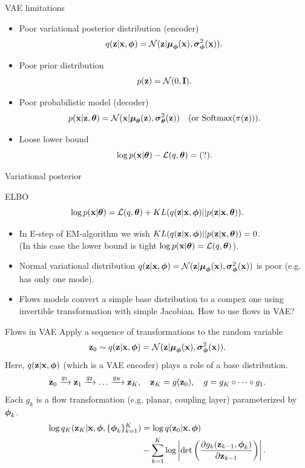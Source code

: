 \begin{frame}{VAE limitations}
\begin{itemize}
	\item Poor variational posterior distribution (encoder)
	\[
	q(\mathbf{z} | \mathbf{x}, \boldsymbol{\phi}) = \mathcal{N}(\mathbf{z}| \boldsymbol{\mu}_{\boldsymbol{\phi}}(\mathbf{x}), \boldsymbol{\sigma}^2_{\boldsymbol{\phi}}(\mathbf{x})).
	\]
	\item Poor prior distribution
	\[
	p(\mathbf{z}) = \mathcal{N}(0, \mathbf{I}).
	\]
	\item Poor probabilistic model (decoder)
	\[
	p(\mathbf{x} | \mathbf{z}, \boldsymbol{\theta}) = \mathcal{N}(\mathbf{x}| \boldsymbol{\mu}_{\boldsymbol{\theta}}(\mathbf{z}), \boldsymbol{\sigma}^2_{\boldsymbol{\theta}}(\mathbf{z})) \quad (\text{or } \text{Softmax}(\pi(\mathbf{z}))).
	\]
	\item Loose lower bound
	\[
	\log p(\mathbf{x} | \boldsymbol{\theta}) - \mathcal{L}(q, \boldsymbol{\theta}) = (?).
	\]
\end{itemize}
\end{frame}
\begin{frame}{Variational posterior}
\begin{block}{ELBO}
	\[
	\log p(\mathbf{x} | \boldsymbol{\theta}) = \mathcal{L}(q, \boldsymbol{\theta}) + KL(q(\mathbf{z} | \mathbf{x}, \boldsymbol{\phi}) || p(\mathbf{z} | \mathbf{x}, \boldsymbol{\theta})).
	\]
\end{block}
\begin{itemize}
	\item In E-step of EM-algorithm we wish $KL(q(\mathbf{z} | \mathbf{x}, \boldsymbol{\phi}) || p(\mathbf{z} | \mathbf{x}, \boldsymbol{\theta})) = 0$. \\
	(In this case the lower bound is tight $\log p(\mathbf{x} | \boldsymbol{\theta}) = \mathcal{L}(q, \boldsymbol{\theta})$). \\
	\item Normal variational distribution $q(\mathbf{z} | \mathbf{x}, \boldsymbol{\phi}) = \mathcal{N}(\mathbf{z}| \boldsymbol{\mu}_{\boldsymbol{\phi}}(\mathbf{x}), \boldsymbol{\sigma}^2_{\boldsymbol{\phi}}(\mathbf{x}))$ is poor (e.g. has only one mode). \\
	\item Flows models convert a simple base distribution to a compex one using invertible transformation with simple Jacobian. How to use flows in VAE?
\end{itemize}
\end{frame}
\begin{frame}{Flows in VAE}
Apply a sequence of transformations to the random variable
\[
\mathbf{z}_0 \sim q(\mathbf{z} | \mathbf{x}, \boldsymbol{\phi}) = \mathcal{N}(\mathbf{z}| \boldsymbol{\mu}_{\boldsymbol{\phi}}(\mathbf{x}), \boldsymbol{\sigma}^2_{\boldsymbol{\phi}}(\mathbf{x})).
\]
Here, $q(\mathbf{z} | \mathbf{x}, \boldsymbol{\phi})$ (which is a VAE encoder) plays a role of a base distribution.
\[
\mathbf{z}_0 \xrightarrow{g_1} \mathbf{z}_1 \xrightarrow{g_2} \dots \xrightarrow{g_K} \mathbf{z}_K, \quad \mathbf{z}_K = g(\mathbf{z}_0), \quad g = g_K \circ \dots \circ g_1.
\]
Each $g_k $ is a flow transformation (e.g. planar, coupling layer) parameterized by $\boldsymbol{\phi}_k$.
\begin{align*}
	\log q_K(\mathbf{z}_K | \mathbf{x}, \boldsymbol{\phi}, \{\boldsymbol{\phi}_k\}_{k=1}^K) &= \log q(\mathbf{z}_0 | \mathbf{x}, \boldsymbol{\phi}) \\ &- \sum_{k=1}^K \log \left| \det \left( \frac{\partial g_k(\mathbf{z}_{k - 1}, \boldsymbol{\phi}_k)}{\partial \mathbf{z}_{k-1}} \right) \right|.
\end{align*}

\end{frame}
